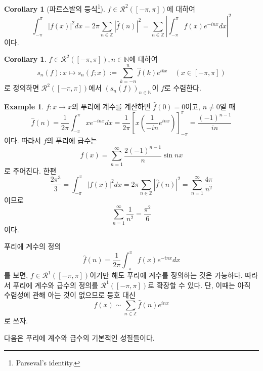 \documentclass[11pt]{book}
\numberwithin{equation}{chapter}
\def\NN{\mathbb{N}}
\def\ZZ{\mathbb{Z}}
\def\calR{\mathcal{R}}
\newcommand{\abs}[1]{\left\vert#1\right\vert}
\newcommand{\paren}[1]{\left(#1\right)}
\newcommand{\sqbracket}[1]{\left[#1\right]}
\theoremstyle{definition}
\newtheorem{cor}[thm]{Corollary}
\newtheorem*{ex}{Example}
\begin{document}
\begin{cor}[파르스발의 등식\footnote{Parseval's identity.}]
    \(f \in \calR^2([-\pi, \pi])\)에 대하여 
    \[
        \int_{-\pi}^\pi \abs{f(x)}^2 dx = 2\pi \sum_{n \in \ZZ} \abs{\hat{f}(n)}^2 = \sum_{n \in \ZZ} \abs{\int_{-\pi}^\pi f(x) e^{-inx} dx}^2
    \]
    이다.
\end{cor}

\begin{cor} \label{15.1.11}
    \(f \in \calR^2([-\pi, \pi]), n \in \NN\)에 대하여
    \[
        s_n(f) : x \mapsto s_n(f ; x) := \sum_{k=-n}^n \hat{f}(k) e^{ikx} \quad (x \in [-\pi, \pi])
    \]
    로 정의하면 \(\calR^2([-\pi, \pi])\)에서 \((s_n(f))_{n \in \NN}\)이 \(f\)로 수렴한다.
\end{cor}

\begin{ex}
    \(f :x \to x\)의 푸리에 계수를 계산하면 \(\hat{f}(0) = 0\)이고, \(n \ne 0\)일 때
    \[
        \hat{f}(n) = \frac{1}{2\pi} \int_{-\pi}^\pi xe^{-inx} dx = \frac{1}{2\pi} \sqbracket{x \paren{\frac{1}{-in} e^{inx}}}_{-\pi}^\pi = \frac{(-1)^{n-1}}{in}
    \]
    이다. 따라서 \(f\)의 푸리에 급수는
    \[
        f(x) = \sum_{n =1}^\infty \frac{2(-1)^{n-1}}{n} \sin nx 
    \]
    로 주어진다. 한편
    \[
        \frac{2\pi^3}{3} = \int_{-\pi}^\pi \abs{f(x)}^2 dx = 2\pi \sum_{n \in \ZZ} \abs{\hat{f}(n)}^2 = \sum_{n=1}^\infty \frac{4\pi}{n^2}
    \]
    이므로
    \[
        \sum_{n=1}^\infty \frac{1}{n^2} = \frac{\pi^2}{6}
    \]
    이다.
\end{ex}

푸리에 계수의 정의
\[
    \hat{f}(n) = \frac{1}{2\pi} \int_{-\pi}^\pi f(x) e^{-inx} dx
\]
를 보면, \(f \in \calR^1([-\pi, \pi])\)이기만 해도 푸리에 계수를 정의하는 것은 가능하다. 따라서 푸리에 계수와 급수의 정의를 \(\calR^1([-\pi, \pi])\)로 확장할 수 있다. 단, 이때는 아직 수렴성에 관해 아는 것이 없으므로 등호 대신
\[
    f(x) \sim \sum_{n \in \ZZ} \hat{f}(n) e^{inx}
\]
로 쓰자.

다음은 푸리에 계수와 급수의 기본적인 성질들이다.
\end{document}

